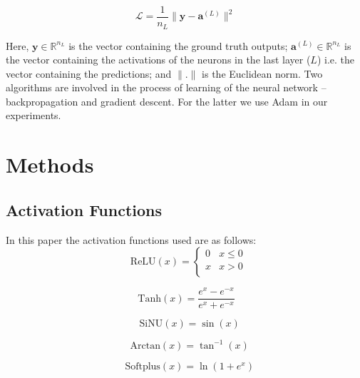\documentclass{article}
\begin{document}
    $$\mathcal{L} = \frac{1}{n_L}\|\bm y - \bm a^{(L)}\|^2$$
    
    Here, $\bm y \in \mathbb{R}^{n_L}$ is the vector containing the ground truth outputs; $\bm a^{(L)} \in \mathbb{R}^{n_L}$ is the vector containing the activations of the neurons in the last layer ($L$) i.e. the vector containing the predictions; and $\|.\|$ is the Euclidean norm.   
    Two algorithms are involved in the process of learning of the neural network -- backpropagation and gradient descent. For the latter we use Adam \cite{adam} in our experiments.
    
\section{Methods}
\label{Methods}

    \subsection{Activation Functions}
    In this paper the activation functions used are as follows: \\
    \iffalse
    $$ \ \ \ \text{ReLU}(x) = \begin{cases} 
                    0 & x \leq 0 \\
                    x & x > 0 \\
                 \end{cases}$$
    
    $$\ \text{Tanh}(x) = \frac{e^x - e^{-x}}{e^x + e^{-x}}$$
    
    $$\ \ \ \ \text{SiNU}(x) = \sin(x)$$
   
    $$\ \ \ \ \text{Arctan}(x) =  \tan^{-1}(x)$$
   
    $$\ \ \ \ \text{Softplus}(x) = \ln{(1+e^{x})}$$
    
\end{document}

